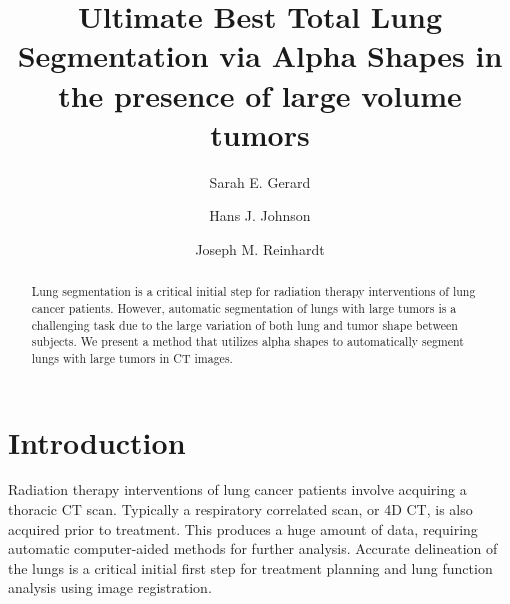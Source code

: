 \documentclass{llncs}
\begin{document}
%
\frontmatter          %
%
\pagestyle{headings}  %
%

%
\tableofcontents
%
\listoftodos

\mainmatter              %
%
\title{Ultimate Best Total Lung Segmentation via Alpha Shapes in the presence of large volume tumors}
%
%
\author{Sarah E. Gerard \and Hans J. Johnson
\and Joseph M. Reinhardt}
%
%
%


\maketitle              %

\begin{abstract}
Lung segmentation is a critical initial step for radiation therapy interventions of lung cancer patients. However, automatic segmentation of lungs with large tumors is a challenging task due to the large variation of both lung and tumor shape between subjects. We present a method that utilizes alpha shapes to automatically segment lungs with large tumors in CT images.

\end{abstract}
%
\section{Introduction}
%
Radiation therapy interventions of lung cancer patients involve acquiring a thoracic CT scan. Typically a respiratory correlated scan, or 4D CT, is also acquired prior to treatment. This produces a huge amount of data, requiring automatic computer-aided methods for further analysis. Accurate delineation of the lungs is a critical initial first step for treatment planning and lung function analysis using image registration.
\end{document}
